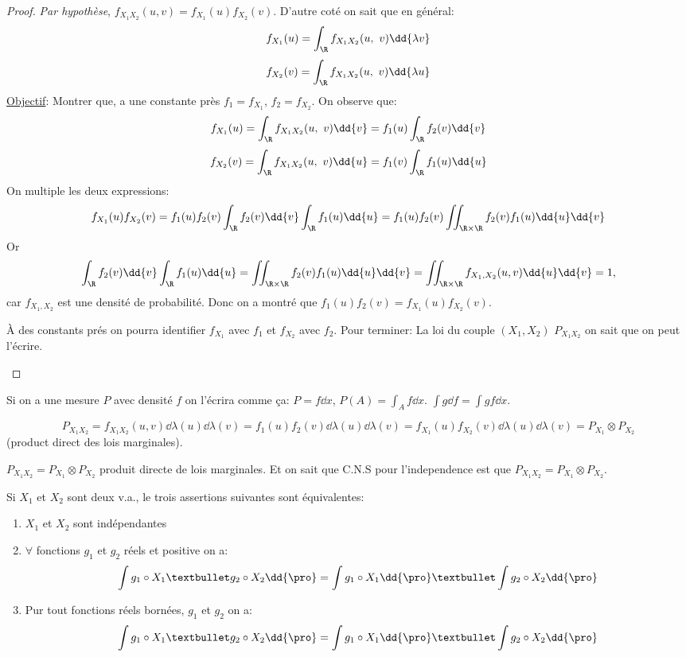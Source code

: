 \begin{proof}
	\emph{Par hypothèse}, $f_{X_1X_2}(u, v)=f_{X_1}(u) f_{X_2}(v)$. D'autre coté on sait que en général:
	$$f_{X_1}(u)=\int_{\R}f_{X_1X_2}(u,\ v)\dd{\lambda v}$$
	$$f_{X_2}(v)=\int_{\R}f_{X_1X_2}(u,\ v)\dd{\lambda u}$$
	\underline{Objectif}: Montrer que, a une constante près $f_1=f_{X_1}$, $f_2=f_{X_2}$. On observe que:
	$$f_{X_1}(u)=\int_{\R}f_{X_1X_2}(u,\ v)\dd{v}=f_1(u)\int_{\R} f_2(v)\dd{v}$$
	$$f_{X_2}(v)=\int_{\R}f_{X_1X_2}(u,\ v)\dd{u}=f_1(v)\int_\R f_1(u)\dd{u}$$
	On multiple les deux expressions:
	$$f_{X_1}(u)f_{X_2}(v)=f_1(u)f_2(v)\int_\R f_2(v)\dd{v}\int_\R f_1(u)\dd{u}=f_1(u)f_2(v)\iint_{\R\times\R} f_2(v) f_1(u)\dd{u}\dd{v}$$
	Or 
	$$ \int_\R f_2(v)\dd{v}\int_\R f_1(u)\dd{u}=\iint_{\R\times\R} f_2(v) f_1(u)\dd{u}\dd{v}=\iint_{\R\times\R} f_{X_1,X_2}(u,v)\dd{u}\dd{v}=1,$$
	car $f_{X_1,X_2}$ est une densité de probabilité.
	Donc on a montré que $f_1(u)f_2(v)=f_{X_1}(u)f_{X_2}(v)$.
	\begin{remark}
		À des constants prés on pourra identifier $f_{X_1}$ avec $f_1$ et $f_{X_2}$ avec $f_2$. Pour terminer: La loi du couple $(X_1, X_2)$ $P_{X_1X_2}$ on sait que on peut l'écrire. 
	\end{remark}
\end{proof}	
\begin{notations}
	Si on a une mesure $P$ avec densité $f$ on l'écrira comme ça: $P=f\dd{x}$, 	$P(A)=\int_A f\dd{x}$. $\int g\dd{f}=\int g f\dd{x}$.
	
		$$P_{X_1X_2}=f_{X_1X_2}(u, v)\dd{\lambda (u)}\dd{\lambda (v)}=f_1(u)f_2(v)	\dd{\lambda (u)}\dd{\lambda (v)}=f_{X_1}(u)f_{X_2}(v)\dd{\lambda (u)}\dd{\lambda (v)}=P_{X_1}\otimes P_{X_2}$$ (product direct des lois marginales).
		
		$P_{X_1X_2}=P_{X_1}\otimes P_{X_2}$ produit directe de lois marginales. Et on sait que C.N.S pour l'independence est que $P_{X_1X_2}=P_{X_1}\otimes P_{X_2}$.
\end{notations}

\begin{proposition}
	Si $X_1$ et $X_2$ sont deux v.a., le trois assertions suivantes sont équivalentes:
	\begin{enumerate}
		\item $X_1$ et $X_2$ sont indépendantes
		\item $\forall$ fonctions $g_1$ et $g_2$ réels et positive on a:
			$$\int g_1\circ X_1 • g_2\circ X_2\dd{\pro}= \int g_1\circ X_1 \dd{\pro}•\int g_2\circ X_2\dd{\pro}$$
		\item Pur tout fonctions réels bornées, $g_1$ et $g_2$ on a:
			$$\int g_1\circ X_1 • g_2\circ X_2\dd{\pro}= \int g_1\circ X_1 \dd{\pro}•\int g_2\circ X_2\dd{\pro}$$
	\end{enumerate}
\end{proposition}

